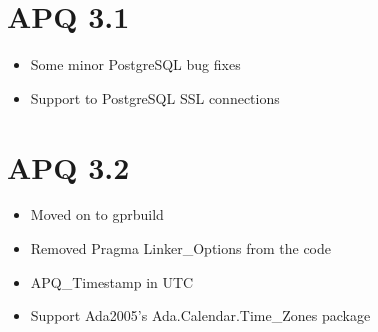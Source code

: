 \documentclass[english,letterpaper]{book}
\begin{document}
\section*{APQ 3.1}

\begin{itemize}
	\item Some minor PostgreSQL bug fixes
	\item Support to PostgreSQL SSL connections
\end{itemize}

\section*{APQ 3.2}

\begin{itemize}
	\item Moved on to gprbuild
	\item Removed Pragma Linker\_Options from the code
	\item APQ\_Timestamp in UTC
	\item Support Ada2005's Ada.Calendar.Time\_Zones package
\end{itemize}


\printindex
\end{document}
